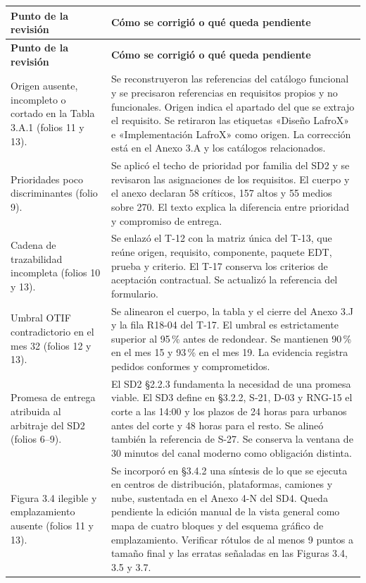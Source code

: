 \documentclass[11pt,letterpaper]{article}
\begin{document}
\begin{longtable}{@{}P{0.33\textwidth}P{\tabcolsep\relax}@{}}
\hline
\textbf{Punto de la revisión} & \textbf{Cómo se corrigió o qué queda pendiente} \\
\hline
\endfirsthead
\hline
\textbf{Punto de la revisión} & \textbf{Cómo se corrigió o qué queda pendiente} \\
\hline
\endhead
\hline
\endfoot
Origen ausente, incompleto o cortado en la Tabla 3.A.1 (folios 11 y 13). &
Se reconstruyeron las referencias del catálogo funcional y se precisaron referencias en requisitos propios y no funcionales. Origen indica el apartado del que se extrajo el requisito. Se retiraron las etiquetas «Diseño LafroX» e «Implementación LafroX» como origen. La corrección está en el Anexo 3.A y los catálogos relacionados. \\
Prioridades poco discriminantes (folio 9). &
Se aplicó el techo de prioridad por familia del SD2 y se revisaron las asignaciones de los requisitos. El cuerpo y el anexo declaran 58 críticos, 157 altos y 55 medios sobre 270. El texto explica la diferencia entre prioridad y compromiso de entrega. \\
Cadena de trazabilidad incompleta (folios 10 y 13). &
Se enlazó el T-12 con la matriz única del T-13, que reúne origen, requisito, componente, paquete EDT, prueba y criterio. El T-17 conserva los criterios de aceptación contractual. Se actualizó la referencia del formulario. \\
Umbral OTIF contradictorio en el mes 32 (folios 12 y 13). &
Se alinearon el cuerpo, la tabla y el cierre del Anexo 3.J y la fila R18-04 del T-17. El umbral es estrictamente superior al 95\,\% antes de redondear. Se mantienen 90\,\% en el mes 15 y 93\,\% en el mes 19. La evidencia registra pedidos conformes y comprometidos. \\
Promesa de entrega atribuida al arbitraje del SD2 (folios 6--9). &
El SD2 §2.2.3 fundamenta la necesidad de una promesa viable. El SD3 define en §3.2.2, S-21, D-03 y RNG-15 el corte a las 14:00 y los plazos de 24 horas para urbanos antes del corte y 48 horas para el resto. Se alineó también la referencia de S-27. Se conserva la ventana de 30 minutos del canal moderno como obligación distinta. \\
Figura 3.4 ilegible y emplazamiento ausente (folios 11 y 13). &
Se incorporó en §3.4.2 una síntesis de lo que se ejecuta en centros de distribución, plataformas, camiones y nube, sustentada en el Anexo 4-N del SD4. Queda pendiente la edición manual de la vista general como mapa de cuatro bloques y del esquema gráfico de emplazamiento. Verificar rótulos de al menos 9 puntos a tamaño final y las erratas señaladas en las Figuras 3.4, 3.5 y 3.7. \\

\end{longtable}
\end{document}
